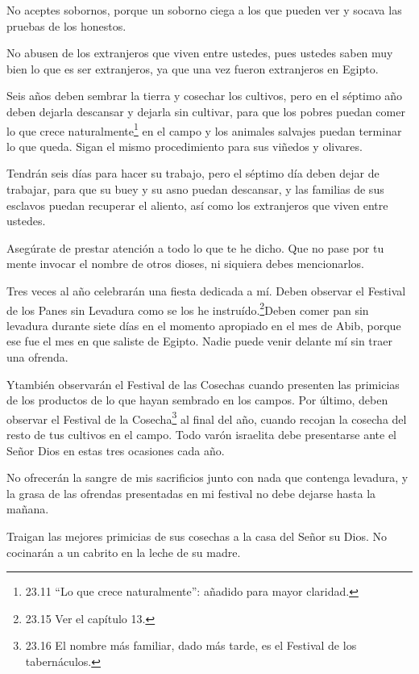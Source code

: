  No aceptes sobornos, porque un soborno ciega a los que
pueden ver y socava las pruebas de los honestos.

 No abusen de los extranjeros que viven entre ustedes, pues
ustedes saben muy bien lo que es ser extranjeros, ya que una vez fueron
extranjeros en Egipto.

 Seis años deben sembrar la tierra y cosechar los cultivos,
 pero en el séptimo año deben dejarla descansar y dejarla
sin cultivar, para que los pobres puedan comer lo que crece
naturalmente\footnote{23.11 ``Lo que crece naturalmente'': añadido para
  mayor claridad.} en el campo y los animales salvajes puedan terminar
lo que queda. Sigan el mismo procedimiento para sus viñedos y olivares.

 Tendrán seis días para hacer su trabajo, pero el séptimo
día deben dejar de trabajar, para que su buey y su asno puedan
descansar, y las familias de sus esclavos puedan recuperar el aliento,
así como los extranjeros que viven entre ustedes.

 Asegúrate de prestar atención a todo lo que te he dicho.
Que no pase por tu mente invocar el nombre de otros dioses, ni siquiera
debes mencionarlos.

 Tres veces al año celebrarán una fiesta dedicada a mí.
 Deben observar el Festival de los Panes sin Levadura como
se los he instruído.\footnote{23.15 Ver el capítulo 13.}Deben comer pan
sin levadura durante siete días en el momento apropiado en el mes de
Abib, porque ese fue el mes en que saliste de Egipto. Nadie puede venir
delante mí sin traer una ofrenda.

 Ytambién observarán el Festival de las Cosechas cuando
presenten las primicias de los productos de lo que hayan sembrado en los
campos. Por último, deben observar el Festival de la Cosecha\footnote{23.16
  El nombre más familiar, dado más tarde, es el Festival de los
  tabernáculos.} al final del año, cuando recojan la cosecha del resto
de tus cultivos en el campo.  Todo varón israelita debe
presentarse ante el Señor Dios en estas tres ocasiones cada año.

 No ofrecerán la sangre de mis sacrificios junto con nada
que contenga levadura, y la grasa de las ofrendas presentadas en mi
festival no debe dejarse hasta la mañana.

 Traigan las mejores primicias de sus cosechas a la casa
del Señor su Dios. No cocinarán a un cabrito en la leche de su madre.

